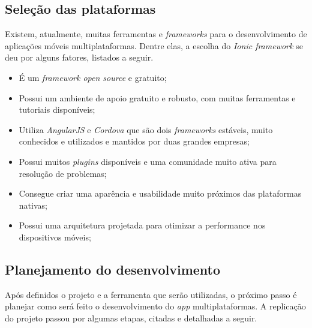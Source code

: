 \subsection{Seleção das plataformas} \label{subsection:selecaodasplataformas}

Existem, atualmente, muitas ferramentas e \textit{frameworks} para o desenvolvimento de aplicações móveis multiplataformas. Dentre elas, a escolha do \textit{Ionic framework} se deu por alguns fatores, listados a seguir. 

\begin{itemize}
    \item É um \textit{framework open source} e gratuito;
    \item Possui um ambiente de apoio gratuito e robusto, com muitas ferramentas e tutoriais disponíveis;
    \item Utiliza \textit{AngularJS} e \textit{Cordova} que são dois \textit{frameworks} estáveis, muito conhecidos e utilizados e mantidos por duas grandes empresas;
    \item Possui muitos \textit{plugins} disponíveis e uma comunidade muito ativa para resolução de problemas; %
    \item Consegue criar uma aparência e usabilidade muito próximos das plataformas nativas; %
    \item Possui uma arquitetura projetada para otimizar a performance nos dispositivos móveis; 
\end{itemize}
 
\subsection{Planejamento do desenvolvimento} \label{subsection:planejamentodesenvolvimento}

Após definidos o projeto e a ferramenta que serão utilizadas, o próximo passo é planejar como será feito o desenvolvimento do \textit{app} multiplataformas. 
A replicação do projeto passou por algumas etapas, citadas e detalhadas a seguir.

